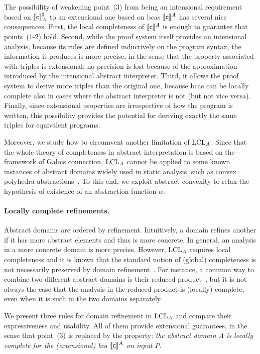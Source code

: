 The possibility of weakening point~(3) from being an intensional requirement based on $\llbracket\mathsf{c}\rrbracket^{\sharp}_A$ to an extensional one based on bcas $\llbracket\mathsf{c}\rrbracket^A$ has several nice consequences.
First, the local completeness of $\llbracket\mathsf{c}\rrbracket^A$ is enough to guarantee that points~(1-2) hold.
Second, while the proof system itself provides an intensional analysis, because its rules are defined inductively on the program syntax, the information it produces is more precise, in the sense that the property associated with triples is extensional: no precision is lost because of the approximation introduced by the intensional abstract interpreter.
Third, it allows the proof system to derive more triples than the original one, because bcas can be locally complete also in cases where the abstract interpreter is not (but not vice versa).
Finally, since extensional properties are irrespective of how the program is written, this possibility provides the potential for deriving exactly the same triples for equivalent programs.

Moreover, we study how to circumvent another limitation of $\text{LCL}_A$. Since that the whole theory of completeness in abstract interpretation is based on the framework of Galois connection, $\text{LCL}_A$ cannot be applied to some known instances of abstract domains widely used in static analysis, such as convex polyhedra abstractions~\cite{CH78}. To this end, we exploit abstract convexity to relax the hypothesis of existence of an abstraction function $\alpha$.

\paragraph{Locally complete refinements.}
Abstract domains are ordered by refinement. 
Intuitively, a domain refines another if it has more abstract elements and thus is more concrete.
In general, an analysis in a more concrete domain is more precise. 
However, $\text{LCL}_A$ requires local completeness and it is known that the standard notion of (global) completeness is not necessarily preserved by domain refinement~\cite{GRS00}. 
For instance, a common way to combine two different abstract domains is their reduced product~\cite{cousot79}, but it is not always the case that the analysis in the reduced product is (locally) complete, even when it is such in the two domains separately. 

We present three rules for domain refinement in $\text{LCL}_A$ and compare their expressiveness and usability. All of them provide extensional guarantees, in the sense that point~(3) is replaced by the property:
\emph{the abstract domain $A$ is locally complete for the (extensional) bca $\llbracket\mathsf{c}\rrbracket^{A}$ on input $P$.}

